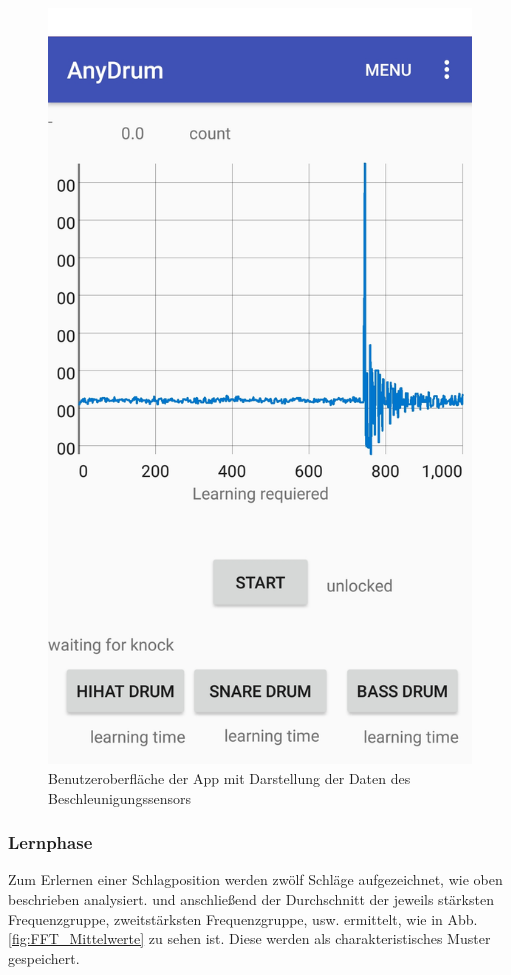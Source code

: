 \begin{figure}[H]
	\centering
	\includegraphics[scale=0.2]{figures/guiA.jpeg}
	\caption{Benutzeroberfläche der App mit Darstellung der Daten des Beschleunigungssensors}
	\label{fig:guiA}
\end{figure}


\subsubsection*{Lernphase}
\label{sec:Lernphase}
Zum Erlernen einer Schlagposition werden zwölf Schläge aufgezeichnet, wie oben beschrieben analysiert. und anschließend der Durchschnitt der jeweils stärksten Frequenzgruppe, zweitstärksten Frequenzgruppe, usw. ermittelt, wie in Abb. \ref{fig:FFT_Mittelwerte} zu sehen ist. Diese werden als charakteristisches Muster gespeichert.

